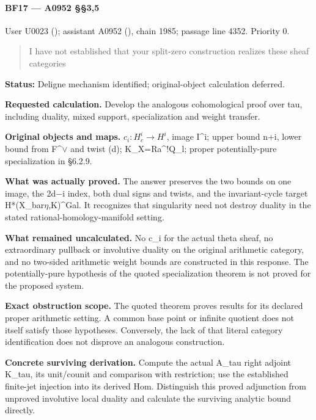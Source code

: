 \paragraph{BF17 --- A0952 §§3,5}\label{bf17-a0952-35}

User U0023 (\protect{});
assistant A0952 (\protect{}),
chain 1985; passage line 4352. Priority 0.

\begin{quote}
I have not established that your split-zero construction realizes these
sheaf categories
\end{quote}

\textbf{Status:} Deligne mechanism identified; original-object
calculation deferred.

\textbf{Requested calculation.} Develop the analogous cohomological
proof over tau, including duality, mixed support, specialization and
weight transfer.

\textbf{Original objects and maps.} \(c_i:H_c^i\to H^i\), image I\^{}i;
upper bound n+i, lower bound from
F\textasciicircum{}\allowbreak{}\ensuremath{∨}\allowbreak{} and twist
(d); K\_X=Ra\^{}!Q\_l; proper potentially-pure specialization in §6.2.9.

\textbf{What was actually proved.} The answer preserves the two bounds
on one image, the 2d\allowbreak{}\ensuremath{−}\allowbreak{}i index,
both dual signs and twists, and the invariant-cycle target
H*(X\_bar\allowbreak{}\ensuremath{η}\allowbreak{},K)\textasciicircum{}Gal.
It recognizes that singularity need not destroy duality in the stated
rational-homology-manifold setting.

\textbf{What remained uncalculated.} No c\_i for the actual theta sheaf,
no extraordinary pullback or involutive duality on the original
arithmetic category, and no two-sided arithmetic weight bounds are
constructed in this response. The potentially-pure hypothesis of the
quoted specialization theorem is not proved for the proposed system.

\textbf{Exact obstruction scope.} The quoted theorem proves results for
its declared proper arithmetic setting. A common base point or infinite
quotient does not itself satisfy those hypotheses. Conversely, the lack
of that literal category identification does not disprove an analogous
construction.

\textbf{Concrete surviving derivation.} Compute the actual A\_tau right
adjoint K\_tau, its unit/counit and comparison with restriction; use the
established finite-jet injection into its derived Hom. Distinguish this
proved adjunction from unproved involutive local duality and calculate
the surviving analytic bound directly.

